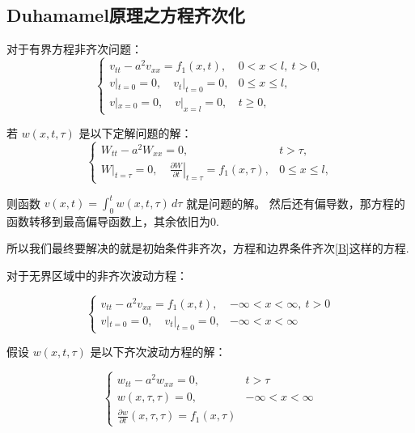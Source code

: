 \documentclass[12pt,a4paper]{article}
\numberwithin{subsection}{section}   %
\numberwithin{subsubsection}{subsection}
\theoremstyle{plain}
\theoremstyle{definition}
\theoremstyle{remark}
\theoremstyle{remark}
\begin{document}
	
	
	
	\subsection{Duhamamel原理之方程齐次化}
	对于有界方程非齐次问题：
	\begin{equation}
		\begin{cases}
			v_{tt} - a^2 v_{xx} = f_1(x, t), & 0 < x < l, \ t > 0, \\
			v|_{t=0} = 0, \quad v_t|_{t=0} = 0, & 0 \leq x \leq l, \\
			v|_{x=0} = 0, \quad v|_{x=l} = 0, & t \geq 0,
		\end{cases}
	\end{equation}
	
	若 \( w(x, t, \tau) \) 是以下定解问题的解：
	\begin{equation}
		\begin{cases}
			W_{tt} - a^2 W_{xx} = 0, & t > \tau, \\
			W|_{t=\tau} = 0, \quad \left. \frac{\partial W}{\partial t} \right|_{t=\tau} = f_1(x, \tau), & 0 \leq x \leq l,
		\end{cases}
	\end{equation}
	
	则函数 \( v(x, t) = \int_0^t w(x, t, \tau) \, d\tau \) 就是问题的解。
	然后还有偏导数，那方程的函数转移到最高偏导函数上，其余依旧为0.
	
	
	
	
	
	所以我们最终要解决的就是初始条件非齐次，方程和边界条件齐次\eqref{B}这样的方程.
	
	对于无界区域中的非齐次波动方程：
	
\begin{equation}
	\begin{cases}
		v_{tt} - a^2 v_{xx} = f_1(x, t), & -\infty < x < \infty, \ t > 0 \\
		v|_{t=0} = 0, \quad v_t|_{t=0} = 0, & -\infty < x < \infty
	\end{cases}
\end{equation}
	
	假设 \(w(x, t, \tau)\) 是以下齐次波动方程的解：
	
\begin{equation}
	\begin{cases}
		w_{tt} - a^2 w_{xx} = 0, & t > \tau \\
		w(x, \tau, \tau) = 0, & -\infty < x < \infty \\
		\frac{\partial w}{\partial t}(x, \tau, \tau) = f_1(x, \tau)
	\end{cases}
\end{equation}
	
\end{document}
